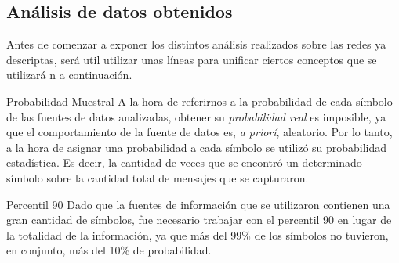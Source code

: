     \subsection{An\'alisis de datos obtenidos}
    \par Antes de comenzar a exponer los distintos an\'alisis realizados sobre las redes
    ya descriptas, ser\'a util utilizar unas l\'ineas para unificar ciertos conceptos que
    se utilizar\'a n a continuaci\'on.

    \begin{LaTeXdescription}
        \item[Probabilidad Muestral] A la hora de referirnos a la probabilidad de cada
        s\'imbolo de las fuentes de datos analizadas, obtener su \textit{probabilidad
        real} es imposible, ya que el comportamiento de la fuente de datos es, \textit{%
        a prior\'i}, aleatorio. Por lo tanto, a la hora de asignar una probabilidad a cada
        s\'imbolo se utiliz\'o su probabilidad estad\'istica. Es decir, la cantidad de
        veces que se encontr\'o un determinado s\'imbolo sobre la cantidad total de mensajes
        que se capturaron.\\

        \item[Percentil 90] Dado que la fuentes de informaci\'on que se utilizaron contienen
        una gran cantidad de s\'imbolos, fue necesario trabajar con el percentil 90 en lugar
        de la totalidad de la informaci\'on, ya que m\'as del 99\% de los s\'imbolos no
        tuvieron, en conjunto, m\'as del 10\% de probabilidad.\\

    \end{LaTeXdescription}


    

    

    

    



